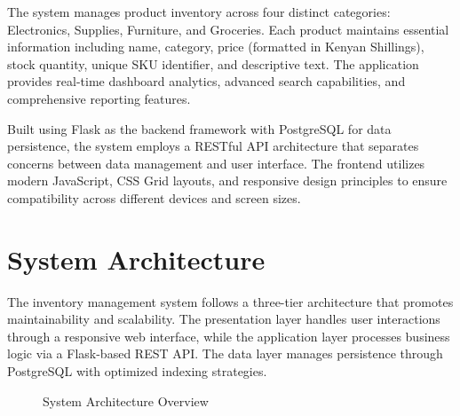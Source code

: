\documentclass[12pt,a4paper]{article}
\begin{document}
The system manages product inventory across four distinct categories: Electronics, Supplies, Furniture, and Groceries. Each product maintains essential information including name, category, price (formatted in Kenyan Shillings), stock quantity, unique SKU identifier, and descriptive text. The application provides real-time dashboard analytics, advanced search capabilities, and comprehensive reporting features.

Built using Flask as the backend framework with PostgreSQL for data persistence, the system employs a RESTful API architecture that separates concerns between data management and user interface. The frontend utilizes modern JavaScript, CSS Grid layouts, and responsive design principles to ensure compatibility across different devices and screen sizes.

\section{System Architecture}

The inventory management system follows a three-tier architecture that promotes maintainability and scalability. The presentation layer handles user interactions through a responsive web interface, while the application layer processes business logic via a Flask-based REST API. The data layer manages persistence through PostgreSQL with optimized indexing strategies.

\begin{figure}[H]
    \centering
    \caption{System Architecture Overview}
\end{figure}
\end{document}
